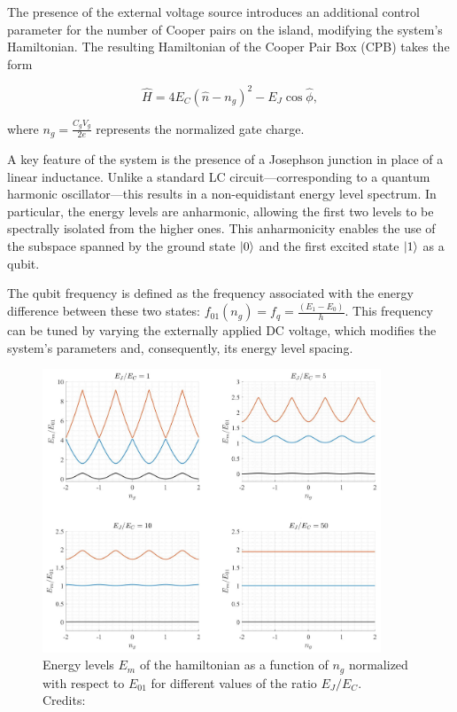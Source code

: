 The presence of the external voltage source introduces an additional control parameter for the number of Cooper pairs on the island, modifying the system's Hamiltonian. 
The resulting Hamiltonian of the Cooper Pair Box (CPB) takes the form

\begin{equation}\label{eq:CPB_complete}
    \hat{H} = 4E_C(\hat{n} - n_g)^2 - E_J \cos{\hat{\phi}},
\end{equation}

where $n_g = \frac{C_g V_g}{2e}$ represents the normalized gate charge.

A key feature of the system is the presence of a Josephson junction in place of a linear inductance. 
Unlike a standard LC circuit—corresponding to a quantum harmonic oscillator—this results in a non-equidistant energy level spectrum. 
In particular, the energy levels are anharmonic, allowing the first two levels to be spectrally isolated from the higher ones. 
This anharmonicity enables the use of the subspace spanned by the ground state $\ket{0}$ and the first excited state $\ket{1}$ as a qubit.

The qubit frequency is defined as the frequency associated with the energy difference between these two states: $f_{01}(n_g) = f_q = \frac{(E_1 - E_0)}{h}$.
This frequency can be tuned by varying the externally applied DC voltage, which modifies the system’s parameters and, consequently, its energy level spacing.\\

\begin{figure}[h!]
    \centering
    \includegraphics[width=0.9\textwidth]{figures/png/energy_levels.png}
    \caption{Energy levels $E_m$ of the hamiltonian as a function of $n_g$ normalized with respect to $E_{01}$ for different values of the ratio $E_J/E_C$. \\ Credits: \cite{Roth_2023}}
    \label{fig:energy_levels}
\end{figure}


